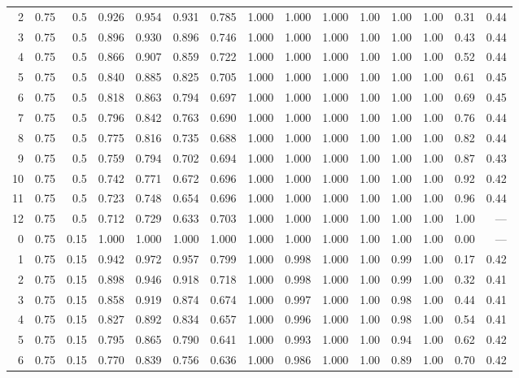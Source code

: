 \begin{landscape}
\begin{longtable}{rrrrrrrrrrrrrrr}
2 & 0.75 & 0.5 & 0.926 & 0.954 & 0.931 & 0.785 & 1.000 & 1.000 & 1.000 & 1.00 & 1.00 & 1.00 & 0.31 & 0.44 \\
3 & 0.75 & 0.5 & 0.896 & 0.930 & 0.896 & 0.746 & 1.000 & 1.000 & 1.000 & 1.00 & 1.00 & 1.00 & 0.43 & 0.44 \\
4 & 0.75 & 0.5 & 0.866 & 0.907 & 0.859 & 0.722 & 1.000 & 1.000 & 1.000 & 1.00 & 1.00 & 1.00 & 0.52 & 0.44 \\
5 & 0.75 & 0.5 & 0.840 & 0.885 & 0.825 & 0.705 & 1.000 & 1.000 & 1.000 & 1.00 & 1.00 & 1.00 & 0.61 & 0.45 \\
6 & 0.75 & 0.5 & 0.818 & 0.863 & 0.794 & 0.697 & 1.000 & 1.000 & 1.000 & 1.00 & 1.00 & 1.00 & 0.69 & 0.45 \\
7 & 0.75 & 0.5 & 0.796 & 0.842 & 0.763 & 0.690 & 1.000 & 1.000 & 1.000 & 1.00 & 1.00 & 1.00 & 0.76 & 0.44 \\
8 & 0.75 & 0.5 & 0.775 & 0.816 & 0.735 & 0.688 & 1.000 & 1.000 & 1.000 & 1.00 & 1.00 & 1.00 & 0.82 & 0.44 \\
9 & 0.75 & 0.5 & 0.759 & 0.794 & 0.702 & 0.694 & 1.000 & 1.000 & 1.000 & 1.00 & 1.00 & 1.00 & 0.87 & 0.43 \\
10 & 0.75 & 0.5 & 0.742 & 0.771 & 0.672 & 0.696 & 1.000 & 1.000 & 1.000 & 1.00 & 1.00 & 1.00 & 0.92 & 0.42 \\
11 & 0.75 & 0.5 & 0.723 & 0.748 & 0.654 & 0.696 & 1.000 & 1.000 & 1.000 & 1.00 & 1.00 & 1.00 & 0.96 & 0.44 \\
12 & 0.75 & 0.5 & 0.712 & 0.729 & 0.633 & 0.703 & 1.000 & 1.000 & 1.000 & 1.00 & 1.00 & 1.00 & 1.00 & --- \\
\midrule
0 & 0.75 & 0.15 & 1.000 & 1.000 & 1.000 & 1.000 & 1.000 & 1.000 & 1.000 & 1.00 & 1.00 & 1.00 & 0.00 & --- \\
1 & 0.75 & 0.15 & 0.942 & 0.972 & 0.957 & 0.799 & 1.000 & 0.998 & 1.000 & 1.00 & 0.99 & 1.00 & 0.17 & 0.42 \\
2 & 0.75 & 0.15 & 0.898 & 0.946 & 0.918 & 0.718 & 1.000 & 0.998 & 1.000 & 1.00 & 0.99 & 1.00 & 0.32 & 0.41 \\
3 & 0.75 & 0.15 & 0.858 & 0.919 & 0.874 & 0.674 & 1.000 & 0.997 & 1.000 & 1.00 & 0.98 & 1.00 & 0.44 & 0.41 \\
4 & 0.75 & 0.15 & 0.827 & 0.892 & 0.834 & 0.657 & 1.000 & 0.996 & 1.000 & 1.00 & 0.98 & 1.00 & 0.54 & 0.41 \\
5 & 0.75 & 0.15 & 0.795 & 0.865 & 0.790 & 0.641 & 1.000 & 0.993 & 1.000 & 1.00 & 0.94 & 1.00 & 0.62 & 0.42 \\
6 & 0.75 & 0.15 & 0.770 & 0.839 & 0.756 & 0.636 & 1.000 & 0.986 & 1.000 & 1.00 & 0.89 & 1.00 & 0.70 & 0.42 \\

\end{longtable}
\end{landscape}

